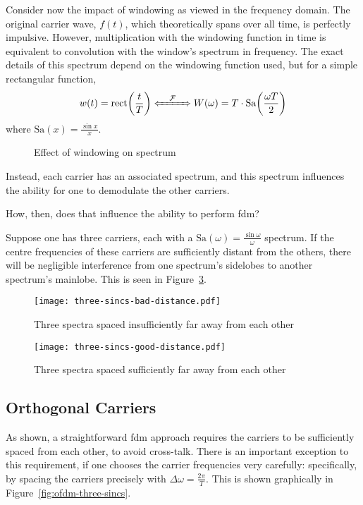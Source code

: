 \documentclass[class=report,11pt,crop=false]{standalone}
\begin{document}
Consider now the impact of windowing as viewed in the frequency domain. The original carrier wave, \(f(t)\), which theoretically spans over all time, is perfectly impulsive. However, multiplication with the windowing function in time is equivalent to convolution with the window's spectrum in frequency. The exact details of this spectrum depend on the windowing function used, but for a simple rectangular function,
\begin{equation}
    w(t) = \textrm{rect}\bigg(\frac{t}{T}\bigg) \xLeftrightarrow{\quad\mathcal{F}\quad} W(\omega) = T \cdot \textrm{Sa}\bigg(\frac{\omega T}{2}\bigg)
\end{equation}
where \(\textrm{Sa}(x)=\frac{\sin{x}}{x}\).

\begin{figure}[htbp]
    \centering
    \def\svgwidth{\linewidth}
    { %
        }
    \caption{Effect of windowing on spectrum}
    \label{fig:sampling-sine-freq}
\end{figure}

Instead, each carrier has an associated spectrum, and this spectrum influences the ability for one to demodulate the other carriers.

How, then, does that influence the ability to perform \gls{fdm}?

Suppose one has three carriers, each with a \(\textrm{Sa}(\omega) = \frac{\sin \omega}{\omega}\) spectrum. If the centre frequencies of these carriers are sufficiently distant from the others, there will be negligible interference from one spectrum's sidelobes to another spectrum's mainlobe. This is seen in Figure~\ref{fig:three-sincs-good-distance}.


\begin{figure}
    \centering
    \texttt{[image: three-sincs-bad-distance.pdf]}
    \caption{Three spectra spaced insufficiently far away from each other}
    \label{fig:three-sincs-bad-distance}
\end{figure}

\begin{figure}[htbp]
    \centering
    \texttt{[image: three-sincs-good-distance.pdf]}
    \caption{Three spectra spaced sufficiently far away from each other}
    \label{fig:three-sincs-good-distance}
\end{figure}



\subsection{Orthogonal Carriers}
As shown, a straightforward \gls{fdm} approach requires the carriers to be sufficiently spaced from each other, to avoid cross-talk. There is an important exception to this requirement, if one chooses the carrier frequencies very carefully: specifically, by spacing the carriers precisely with \(\Delta \omega = \frac{2\pi}{T}\). This is shown graphically in Figure~\ref{fig:ofdm-three-sincs}.
\end{document}
